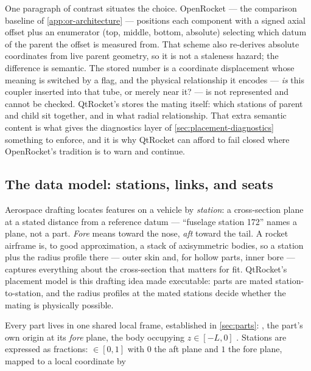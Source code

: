 One paragraph of contrast situates the choice. OpenRocket --- the comparison baseline of
\cref{app:or-architecture} --- positions each component with a signed axial offset plus an
 enumerator (top, middle, bottom, absolute) selecting which datum of the
parent the offset is measured from. That scheme also re-derives absolute coordinates from
live parent geometry, so it is not a staleness hazard; the difference is semantic. The
stored number is a coordinate displacement whose meaning is switched by a flag, and the
physical relationship it encodes --- \emph{is} this coupler inserted into that tube, or
merely near it? --- is not represented and cannot be checked. QtRocket's
 stores the mating itself: which stations of parent and child sit
together, and in what radial relationship. That extra semantic content is what gives the
diagnostics layer of \cref{sec:placement-diagnostics} something to enforce, and it is why
QtRocket can afford to fail closed where OpenRocket's tradition is to warn and continue.

\subsection{The data model: stations, links, and seats}\label{sec:placement-datamodel}

\begin{physbox}
Aerospace drafting locates features on a vehicle by \emph{station}: a cross-section plane
at a stated distance from a reference datum --- ``fuselage station 172'' names a plane,
not a part. \emph{Fore} means toward the nose, \emph{aft} toward the tail. A rocket
airframe is, to good approximation, a stack of axisymmetric bodies, so a station plus the
radius profile there --- outer skin and, for hollow parts, inner bore --- captures
everything about the cross-section that matters for fit. QtRocket's placement model is
this drafting idea made executable: parts are mated station-to-station, and the radius
profiles at the mated stations decide whether the mating is physically possible.
\end{physbox}

Every part lives in one shared local frame, established in \cref{sec:parts}: \zfwd, the
part's own origin at its \emph{fore} plane, the body occupying $z \in [-L, 0]$
. Stations are expressed as fractions: 
$\in [0,1]$ with $0$ the aft plane and $1$ the fore plane, mapped to a local coordinate by

